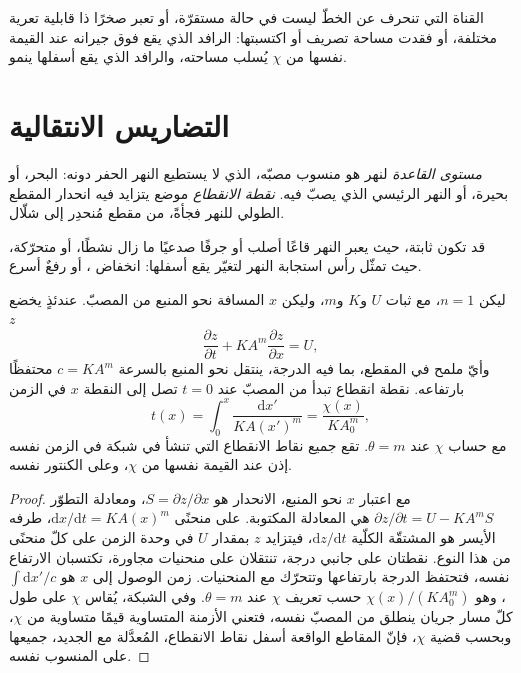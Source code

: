القناة التي تنحرف عن الخطّ ليست في حالة مستقرّة، أو تعبر
صخرًا ذا قابلية تعرية مختلفة، أو فقدت مساحة تصريف أو اكتسبتها:
الرافد الذي يقع فوق جيرانه عند القيمة نفسها من $\chi$ يُسلب مساحته،
والرافد الذي يقع أسفلها ينمو.

\section{التضاريس الانتقالية}\label{sec:b3:quantitative-geomorphology:transient}

\begin{definition}\label{def:b3:quantitative-geomorphology:knickpoint}
\emph{مستوى القاعدة} لنهر هو منسوب مصبّه،
الذي لا يستطيع النهر الحفر دونه: البحر، أو بحيرة، أو النهر الرئيسي الذي
يصبّ فيه. \emph{نقطة الانقطاع} موضع يتزايد فيه انحدار
المقطع الطولي للنهر فجأةً، من مقطع مُنحدِر إلى
شلّال.
\end{definition}

قد تكون  ثابتة، حيث يعبر النهر قاعًا أصلب أو
جرفًا صدعيًا ما زال نشطًا، أو متحرّكة، حيث تمثّل رأس
استجابة النهر لتغيّر يقع أسفلها: انخفاض ، أو
رفعٌ أسرع.

\begin{theorem}\label{thm:b3:quantitative-geomorphology:kinematic}
ليكن $n = 1$، مع ثبات $U$ و$K$ و$m$، وليكن $x$ المسافة
نحو المنبع من المصبّ. عندئذٍ يخضع $z$
\[
\frac{\partial z}{\partial t} + K A^m \frac{\partial z}{\partial x} = U ,
\]
وأيّ ملمح في المقطع، بما فيه الدرجة، ينتقل نحو المنبع بالسرعة
$c = K A^m$ محتفظًا بارتفاعه. نقطة انقطاع تبدأ من
المصبّ عند $t = 0$ تصل إلى النقطة $x$ في الزمن
\[
t(x) = \int_0^x \frac{\mathrm{d}x'}{K A(x')^m} = \frac{\chi(x)}{K A_0^m},
\]
مع حساب $\chi$ عند $\theta = m$. تقع جميع نقاط الانقطاع التي تنشأ في شبكة
في الزمن نفسه إذن عند القيمة نفسها من $\chi$، وعلى الكنتور نفسه.
\end{theorem}

\begin{proof}
مع اعتبار $x$ نحو المنبع، الانحدار هو $S = \partial z/\partial x$،
ومعادلة التطوّر $\partial z/\partial t = U - K A^m S$ هي المعادلة
المكتوبة. على منحنًى $\mathrm{d}x/\mathrm{d}t = K A(x)^m$، طرفه الأيسر
هو المشتقّة الكلّية $\mathrm{d}z/\mathrm{d}t$، فيتزايد $z$ بمقدار $U$ في
وحدة الزمن على كلّ منحنًى من هذا النوع. نقطتان على جانبي درجة،
تنتقلان على منحنيات مجاورة، تكتسبان الارتفاع نفسه، فتحتفظ الدرجة
بارتفاعها وتتحرّك مع المنحنيات. زمن الوصول إلى $x$ هو
$\int \mathrm{d}x'/c$، وهو $\chi(x)/(K A_0^m)$ حسب تعريف
$\chi$ عند $\theta = m$. وفي الشبكة، يُقاس $\chi$ على طول كلّ
مسار جريان ينطلق من المصبّ نفسه، فتعني الأزمنة المتساوية قيمًا متساوية من $\chi$، وبحسب
قضية $\chi$، فإنّ المقاطع الواقعة أسفل نقاط الانقطاع، المُعدَّلة
مع  الجديد، جميعها على المنسوب نفسه.
\end{proof}

